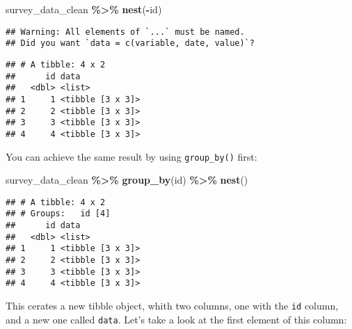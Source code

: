 \documentclass[
]{article}
\newenvironment{Shaded}{\begin{snugshade}}{\end{snugshade}}
\newcommand{\DecValTok}[1]{\textcolor[rgb]{0.00,0.00,0.81}{#1}}
\newcommand{\KeywordTok}[1]{\textcolor[rgb]{0.13,0.29,0.53}{\textbf{#1}}}
\newcommand{\NormalTok}[1]{#1}
\newcommand{\OperatorTok}[1]{\textcolor[rgb]{0.81,0.36,0.00}{\textbf{#1}}}
\newcommand{\StringTok}[1]{\textcolor[rgb]{0.31,0.60,0.02}{#1}}
\begin{document}
\begin{Shaded}
\begin{Highlighting}[]
\NormalTok{survey\_data\_clean }\OperatorTok{\%\textgreater{}\%}
\StringTok{    }\KeywordTok{nest}\NormalTok{(}\OperatorTok{{-}}\NormalTok{id)}
\end{Highlighting}
\end{Shaded}

\begin{verbatim}
## Warning: All elements of `...` must be named.
## Did you want `data = c(variable, date, value)`?
\end{verbatim}

\begin{verbatim}
## # A tibble: 4 x 2
##      id data            
##   <dbl> <list>          
## 1     1 <tibble [3 x 3]>
## 2     2 <tibble [3 x 3]>
## 3     3 <tibble [3 x 3]>
## 4     4 <tibble [3 x 3]>
\end{verbatim}

You can achieve the same result by using \texttt{group\_by()} first:

\begin{Shaded}
\begin{Highlighting}[]
\NormalTok{survey\_data\_clean }\OperatorTok{\%\textgreater{}\%}
\StringTok{    }\KeywordTok{group\_by}\NormalTok{(id) }\OperatorTok{\%\textgreater{}\%}
\StringTok{    }\KeywordTok{nest}\NormalTok{()}
\end{Highlighting}
\end{Shaded}

\begin{verbatim}
## # A tibble: 4 x 2
## # Groups:   id [4]
##      id data            
##   <dbl> <list>          
## 1     1 <tibble [3 x 3]>
## 2     2 <tibble [3 x 3]>
## 3     3 <tibble [3 x 3]>
## 4     4 <tibble [3 x 3]>
\end{verbatim}

This cerates a new tibble object, whith two columns, one with the \texttt{id} column, and a new one called
\texttt{data}. Let's take a look at the first element of this column:

\begin{Shaded}
\end{Shaded}
\end{document}
